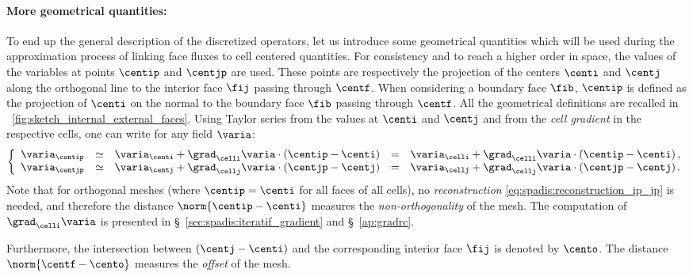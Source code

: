  \paragraph{More geometrical quantities:}
To end up the general description of the discretized operators, let us introduce some geometrical
quantities which will be used during the approximation process of linking face fluxes to
cell centered quantities.
For consistency and to reach a higher order in space, the values of the
variables at points $\centip$ and $\centjp$ are used.
These points are respectively the projection of the centers $\centi$ and $\centj$
along the orthogonal line to the interior face $\fij$ passing through $\centf$.
When considering a boundary face $\fib$, $\centip$ is defined as the projection of $\centi$
on the normal to the boundary face $\fib$ passing through $\centf$. All the geometrical
definitions are recalled in \figurename~\ref{fig:sketch_internal_external_faces}.
%
Using Taylor series from the values at $\centi$ and $\centj$ and from the \emph{cell gradient}
in the respective cells, one can write for any field $\varia$:
\begin{equation}\label{eq:spadis:reconstruction_ip_jp}
\left\lbrace
\begin{array}{r c l c l}
\varia_{\centip} &\simeq & \varia_{\centi} + \grad_{\celli} \varia \cdot \left(\centip - \centi\right) &=& \varia_{\celli} + \grad_{\celli} \varia \cdot \left(\centip - \centi\right),  \\
\varia_{\centjp} &\simeq & \varia_{\centj} + \grad_{\cellj} \varia \cdot \left(\centjp - \centj\right) & =& \varia_{\cellj} + \grad_{\cellj} \varia \cdot \left(\centjp - \centj\right).
\end{array}
\right.
\end{equation}
Note that for orthogonal meshes (where $\centip = \centi$ for all faces of all cells),
no \emph{reconstruction} \eqref{eq:spadis:reconstruction_ip_jp} is needed,
and therefore the distance $\norm{\centip - \centi}$ measures the \emph{non-orthogonality} of the mesh.
The computation of $\grad_{\celli} \varia$ is presented in  \S~\ref{sec:spadis:iteratif_gradient} and \S~\ref{ap:gradrc}.

Furthermore, the intersection between $\left(\centj - \centi\right)$ and the corresponding interior face $\fij$ is denoted by $\cento$.
The distance $\norm{\centf - \cento}$ measures the \emph{offset} of the mesh.

